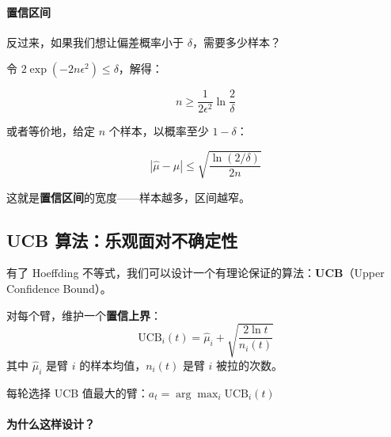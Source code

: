 \paragraph{置信区间}

反过来，如果我们想让偏差概率小于 $\delta$，需要多少样本？

令 $2\exp(-2n\epsilon^2) \leq \delta$，解得：

\begin{equation}
    n \geq \frac{1}{2\epsilon^2} \ln\frac{2}{\delta}
\end{equation}

或者等价地，给定 $n$ 个样本，以概率至少 $1-\delta$：

\begin{equation}
    |\hat{\mu} - \mu| \leq \sqrt{\frac{\ln(2/\delta)}{2n}}
\end{equation}

这就是\textbf{置信区间}的宽度——样本越多，区间越窄。

\subsection{UCB 算法：乐观面对不确定性}

有了 Hoeffding 不等式，我们可以设计一个有理论保证的算法：\textbf{UCB}（Upper Confidence Bound）。

\begin{keyidea}
对每个臂，维护一个\textbf{置信上界}：
\begin{equation}
    \text{UCB}_i(t) = \hat{\mu}_i + \sqrt{\frac{2\ln t}{n_i(t)}}
\end{equation}
其中 $\hat{\mu}_i$ 是臂 $i$ 的样本均值，$n_i(t)$ 是臂 $i$ 被拉的次数。

每轮选择 UCB 值最大的臂：$a_t = \arg\max_i \text{UCB}_i(t)$
\end{keyidea}

\paragraph{为什么这样设计？}\mbox{}\par\nopagebreak

